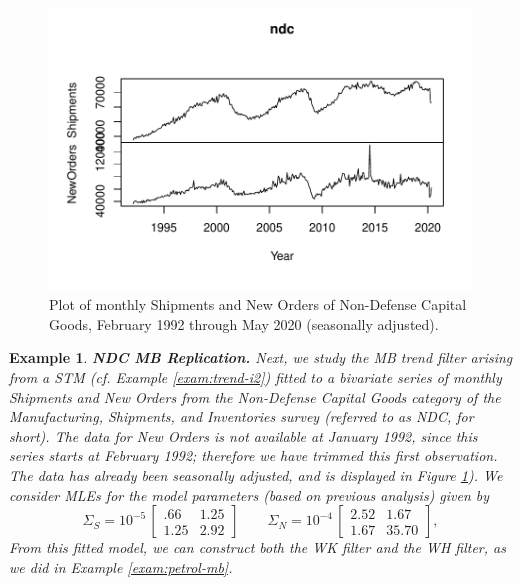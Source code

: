 \documentclass[a4paper]{book}
\newtheorem{Example}{Example}
\begin{document}
\begin{figure}[htb!]
\begin{center}
\includegraphics[]{ndc_data.pdf}
\caption{Plot of monthly  Shipments and New Orders of Non-Defense Capital Goods, 
  February 1992 through May 2020 (seasonally adjusted). }
\label{fig:ndcdata}
\end{center}
\end{figure}  



\begin{Example} {\bf NDC MB Replication.} \rm
\label{exam:ndc-mb}
Next, we  study the  MB trend filter arising from a STM  
(cf. Example \ref{exam:trend-i2}) fitted
 to a   bivariate   series of  monthly Shipments and New Orders from 
 the Non-Defense Capital Goods category of the Manufacturing, Shipments,
and Inventories survey (referred to as NDC, for short). 
The data for New Orders is not available at January
1992, since this series starts at February 1992;
 therefore we have trimmed this first observation.
 The data has already been seasonally adjusted, and is 
  displayed in  Figure \ref{fig:ndcdata}).
We consider MLEs for the model parameters (based on previous analysis)  given by
\[
 \Sigma_{S} = 10^{-5} \, \left[ \begin{array}{ll} 
   .66   &  1.25   \\
   1.25  &  2.92   \end{array}  \right]
 \qquad  \Sigma_{N} =  10^{-4} \, \left[ \begin{array}{ll}
        2.52  &  1.67    \\
        1.67 &  35.70   \end{array} \right],
\]
   From this fitted model,  we can construct both the WK filter 
   and the WH filter, as we did in Example \ref{exam:petrol-mb}.
\end{Example}
 
\end{document}

